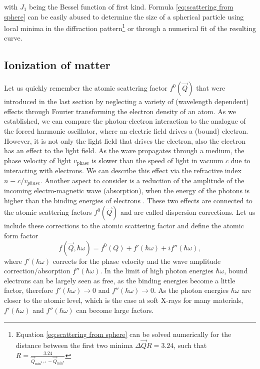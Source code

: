 with $J_{1}$ being the Bessel function of first kind. Formula \eqref{eq:scattering from sphere} can be easily abused to determine the size of a spherical particle using local minima in the diffraction pattern\footnote{Equation \eqref{eq:scattering from sphere} can be solved numerically for the distance between the first two minima $\Delta\vec{Q}R=3.24$, such that $R=\frac{3.24}{\vec{Q}_{\text{min}^{n+1}}-\vec{Q}_{\text{min}^{n}}}$} or through a numerical fit of the resulting curve.
%
%
%
%
%
%
\subsection{Ionization of matter}\label{sec:absorption}
Let us quickly remember the atomic scattering factor $f^{0}\left(\vec{Q}\right)$ that were introduced in the last section by neglecting a variety of (wavelength dependent) effects through Fourier transforming the electron density of an atom. As we established, we can compare the photon-electron interaction to the analogue of the forced harmonic oscillator, where an electric field drives a (bound) electron. However, it is not only the light field that drives the electron, also the electron has an effect to the light field. As the wave propagates through a medium, the phase velocity of light $v_{\text{phase}}$ is slower than the speed of light in vacuum $c$ due to interacting with electrons. We can describe this effect via the refractive index $n\equiv c/v_{phase}$. Another aspect to consider is a reduction of the amplitude of the incoming electro-magnetic wave (absorption), when the energy of the photons is higher than the binding energies of electrons \citep{Als-Nielson-2011-JWS,Attwood-2007-CUP}. These two effects are connected to the atomic scattering factors $f^{0}\left(\vec{Q}\right)$ and are called dispersion corrections. Let us include these corrections to the atomic scattering factor and define the atomic form factor
\begin{equation}
f\left(\vec{Q},\hbar\omega\right)=f^{0}\left(Q\right)+f'\left(\hbar\omega\right)+i f''\left(\hbar\omega\right),
\label{eq:scattering-factor-dispersion-corr}
\end{equation}
where $f'\left(\hbar\omega\right)$ corrects for the phase velocity and the wave amplitude correction/absorption $f''\left(\hbar\omega\right)$. In the limit of high photon energies $\hbar \omega$, bound electrons can be largely seen as free, as the binding energies become a little factor, therefore $f'\left(\hbar\omega\right)\rightarrow 0$ and $f''\left(\hbar\omega\right)\rightarrow 0$. As the photon energies $\hbar \omega$ are closer to the atomic level, which is the case at soft X-rays for many materials, $f'\left(\hbar\omega\right)$ and $f''\left(\hbar\omega\right)$ can become large factors.\\

